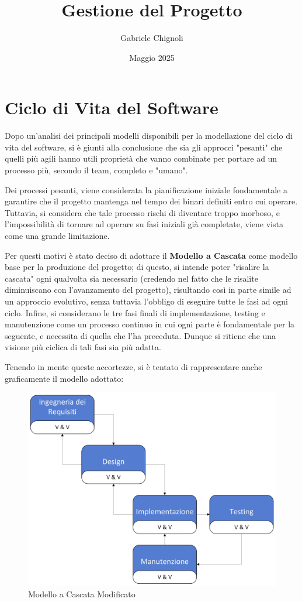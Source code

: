 \documentclass{article}
\title{\huge Gestione del Progetto}
\author{Gabriele Chignoli}
\date{Maggio 2025}
\begin{document}
\maketitle
\newpage
\tableofcontents
\newpage

\section{Ciclo di Vita del Software}
Dopo un'analisi dei principali modelli disponibili per la modellazione del ciclo di vita del software, si è giunti alla conclusione che sia gli approcci "pesanti" che quelli più agili hanno utili proprietà che vanno combinate per portare ad un processo più, secondo il team, completo e "umano".  \newline 

Dei processi pesanti, viene considerata la pianificazione iniziale fondamentale a garantire che il progetto mantenga nel tempo dei binari definiti entro cui operare. Tuttavia, si considera che tale processo rischi di diventare troppo morboso, e l'impossibilità di tornare ad operare su fasi iniziali già completate, viene vista come una grande limitazione. 

Per questi motivi è stato deciso di adottare il \textbf{Modello a Cascata} come modello base per la produzione del progetto; di questo, si intende poter "risalire la cascata" ogni qualvolta sia necessario (credendo nel fatto che le risalite diminuiscano con l'avanzamento del progetto), risultando così in parte simile ad un approccio evolutivo, senza tuttavia l'obbligo di eseguire tutte le fasi ad ogni ciclo. Infine, si considerano le tre fasi finali di implementazione, testing e manutenzione come un processo continuo in cui ogni parte è fondamentale per la seguente, e necessita di quella che l'ha preceduta. Dunque si ritiene che una visione più ciclica di tali fasi sia più adatta. \newline 

Tenendo in mente queste accortezze, si è tentato di rappresentare anche graficamente il modello adottato:

\begin{figure}[H]
    \centering
    \includegraphics[width=.8\linewidth]{imgs/Modello a Cascata_0.png}
    \caption{Modello a Cascata Modificato}
    \label{fig:enter-label}
\end{figure}
\end{document}
